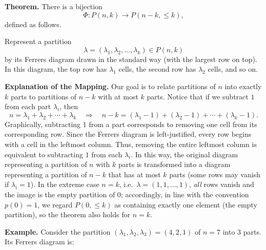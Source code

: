 \documentclass[docmute]{article}
\begin{document}
\bigskip

\textbf{Theorem.} There is a bijection
\[
\Phi\colon P(n,k) \longrightarrow P(n-k,\le k),
\]
defined as follows.

\medskip

Represent a partition
\[
\lambda=(\lambda_1,\lambda_2,\dots,\lambda_k)\in P(n,k)
\]
by its Ferrers diagram drawn in the standard way (with the largest row on top). In this diagram, the top row has \(\lambda_1\) cells, the second row has \(\lambda_2\) cells, and so on.

\medskip

\textbf{Explanation of the Mapping.}  
Our goal is to relate partitions of \(n\) into exactly \(k\) parts to partitions of \(n-k\) with at most \(k\) parts. Notice that if we subtract \(1\) from each part \(\lambda_i\), then
\[
n = \lambda_1+\lambda_2+\cdots+\lambda_k \quad \Longrightarrow \quad n-k = (\lambda_1-1)+(\lambda_2-1)+\cdots+(\lambda_k-1).
\]
Graphically, subtracting \(1\) from a part corresponds to removing one cell from its corresponding row. Since the Ferrers diagram is left-justified, every row begins with a cell in the leftmost column. Thus, removing the entire leftmost column is equivalent to subtracting \(1\) from each \(\lambda_i\). In this way, the original diagram representing a partition of \(n\) with \(k\) parts is transformed into a diagram representing a partition of \(n-k\) that has at most \(k\) parts (some rows may vanish if \(\lambda_i=1\)). In the extreme case \(n=k\), i.e.\ \(\lambda=(1,1,\dots,1)\), \emph{all} rows vanish and the image is the empty partition of \(0\); accordingly, in line with the convention \(p(0)=1\), we regard \(P(0,\le k)\) as containing exactly one element (the empty partition), so the theorem also holds for \(n=k\).

\medskip

\textbf{Example.} Consider the partition \((\lambda_1,\lambda_2,\lambda_3)=(4,2,1)\) of \(n=7\) into \(3\) parts. Its Ferrers diagram is:

\begin{center}
\end{center}
\end{document}
